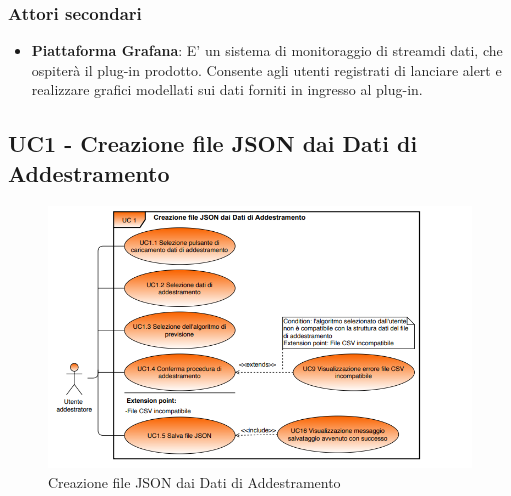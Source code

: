 	\subsubsection{Attori secondari}
	\begin{itemize}
		\item\textbf{Piattaforma Grafana}: E' un sistema di monitoraggio di stream\glo di dati, che ospiterà il plug-in prodotto. Consente agli utenti registrati di lanciare alert e realizzare grafici modellati sui dati forniti in ingresso al plug-in.
 	\end{itemize}

	\label{par:UC1}
	\subsection{UC1 - Creazione file JSON dai Dati di Addestramento}

	\begin{figure}[H]
		\centering
		\includegraphics[scale=0.70]{../Analisi_dei_requisiti/img/Diagrammi_UML/UC1_tool_di_addestramento.png}
		\caption{Creazione file JSON dai Dati di Addestramento}
	\end{figure}	

